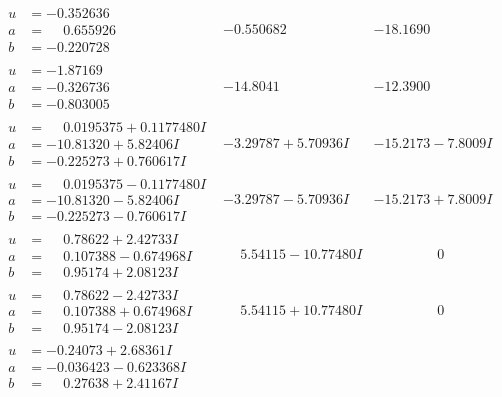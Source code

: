 \documentclass[1p]{elsarticle_modified}
\theoremstyle{definition}
\begin{document}
$$\begin{array}{c|c|c}
\begin{aligned}
u &= -0.352636\phantom{ +0.000000I} \\
a &= \phantom{-}0.655926\phantom{ +0.000000I} \\
b &= -0.220728\phantom{ +0.000000I}\end{aligned}
 & -0.550682\phantom{ +0.000000I} & -18.1690\phantom{ +0.000000I} \\ \hline\begin{aligned}
u &= -1.87169\phantom{ +0.000000I} \\
a &= -0.326736\phantom{ +0.000000I} \\
b &= -0.803005\phantom{ +0.000000I}\end{aligned}
 & -14.8041\phantom{ +0.000000I} & -12.3900\phantom{ +0.000000I} \\ \hline\begin{aligned}
u &= \phantom{-}0.0195375 + 0.1177480 I \\
a &= -10.81320 + 5.82406 I \\
b &= -0.225273 + 0.760617 I\end{aligned}
 & -3.29787 + 5.70936 I & -15.2173 - 7.8009 I \\ \hline\begin{aligned}
u &= \phantom{-}0.0195375 - 0.1177480 I \\
a &= -10.81320 - 5.82406 I \\
b &= -0.225273 - 0.760617 I\end{aligned}
 & -3.29787 - 5.70936 I & -15.2173 + 7.8009 I \\ \hline\begin{aligned}
u &= \phantom{-}0.78622 + 2.42733 I \\
a &= \phantom{-}0.107388 - 0.674968 I \\
b &= \phantom{-}0.95174 + 2.08123 I\end{aligned}
 & \phantom{-}5.54115 - 10.77480 I & \phantom{-0.000000 } 0 \\ \hline\begin{aligned}
u &= \phantom{-}0.78622 - 2.42733 I \\
a &= \phantom{-}0.107388 + 0.674968 I \\
b &= \phantom{-}0.95174 - 2.08123 I\end{aligned}
 & \phantom{-}5.54115 + 10.77480 I & \phantom{-0.000000 } 0 \\ \hline\begin{aligned}
u &= -0.24073 + 2.68361 I \\
a &= -0.036423 - 0.623368 I \\
b &= \phantom{-}0.27638 + 2.41167 I\end{aligned}

\end{array}$$
\end{document}
